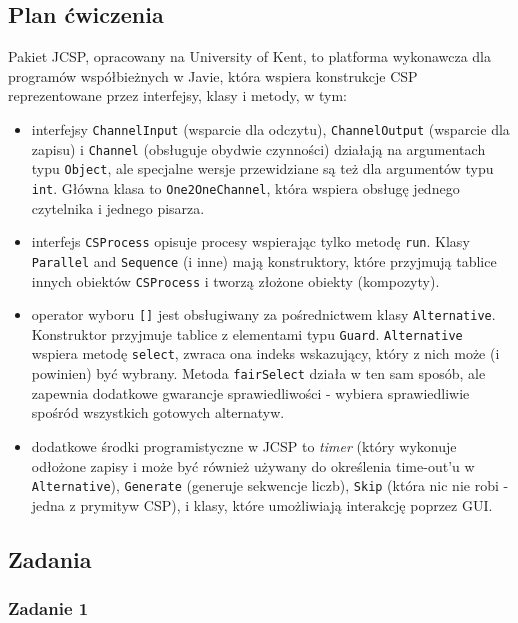 \documentclass[11pt]{article}
\begin{document}
    \hypertarget{plan-ux107wiczenia}{%
\subsection{Plan ćwiczenia}\label{plan-ux107wiczenia}}

Pakiet JCSP, opracowany na University of Kent, to platforma wykonawcza
dla programów współbieżnych w Javie, która wspiera konstrukcje CSP
reprezentowane przez interfejsy, klasy i metody, w tym:

\begin{itemize}
\item
  interfejsy \texttt{ChannelInput} (wsparcie dla odczytu),
  \texttt{ChannelOutput} (wsparcie dla zapisu) i \texttt{Channel}
  (obsługuje obydwie czynności) działają na argumentach typu
  \texttt{Object}, ale specjalne wersje przewidziane są też dla
  argumentów typu \texttt{int}. Główna klasa to \texttt{One2OneChannel},
  która wspiera obsługę jednego czytelnika i jednego pisarza.
\item
  interfejs \texttt{CSProcess} opisuje procesy wspierając tylko metodę
  \texttt{run}. Klasy \texttt{Parallel} and \texttt{Sequence} (i inne)
  mają konstruktory, które przyjmują tablice innych obiektów
  \texttt{CSProcess} i tworzą złożone obiekty (kompozyty).
\item
  operator wyboru \texttt{{[}{]}} jest obsługiwany za pośrednictwem
  klasy \texttt{Alternative}. Konstruktor przyjmuje tablice z elementami
  typu \texttt{Guard}. \texttt{Alternative} wspiera metodę
  \texttt{select}, zwraca ona indeks wskazujący, który z nich może (i
  powinien) być wybrany. Metoda \texttt{fairSelect} działa w ten sam
  sposób, ale zapewnia dodatkowe gwarancje sprawiedliwości - wybiera
  sprawiedliwie spośród wszystkich gotowych alternatyw.
\item
  dodatkowe środki programistyczne w JCSP to \emph{timer} (który
  wykonuje odłożone zapisy i może być również używany do określenia
  time-out'u w \texttt{Alternative}), \texttt{Generate} (generuje
  sekwencje liczb), \texttt{Skip} (która nic nie robi - jedna z prymityw
  CSP), i klasy, które umożliwiają interakcję poprzez GUI.
\end{itemize}

    \hypertarget{zadania}{%
\subsection{Zadania}\label{zadania}}

\hypertarget{zadanie-1}{%
\subsubsection{Zadanie 1}\label{zadanie-1}}
\end{document}
